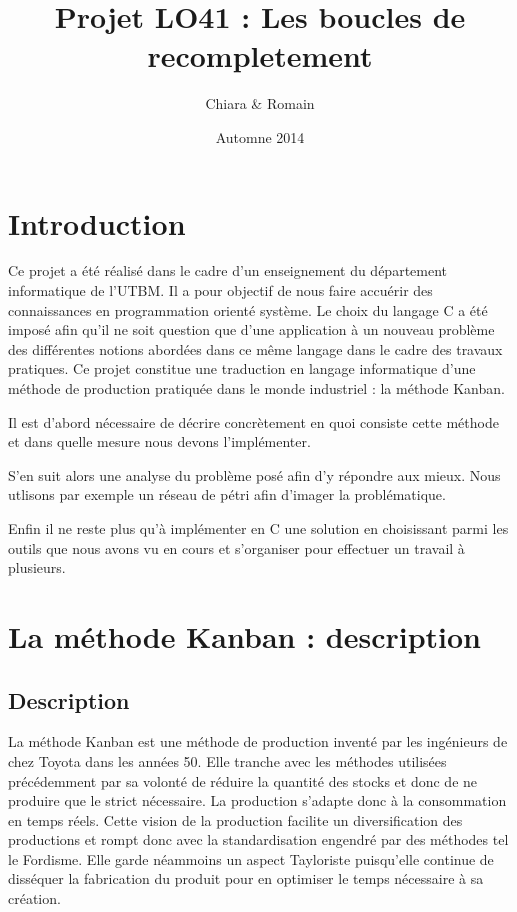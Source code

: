 \documentclass[11pt]{report}
\title{ Projet LO41 : Les boucles de recompletement}
\author{Chiara \bsc{Salvoni} \& Romain \bsc{Thibaud}}
\date{Automne 2014}
\begin{document}
\maketitle

\tableofcontents

\chapter{Introduction}

Ce projet a été réalisé dans le cadre d'un enseignement du département informatique de l'UTBM. Il a pour objectif de nous faire accuérir des connaissances en programmation orienté système. Le choix du langage C a été imposé afin qu'il ne soit question que d'une application à un nouveau problème des différentes notions abordées dans ce même langage dans le cadre des travaux pratiques. Ce projet constitue une traduction en langage informatique d'une méthode de production pratiquée dans le monde industriel : la méthode Kanban. 

Il est d'abord nécessaire de décrire concrètement en quoi consiste cette méthode et dans quelle mesure nous devons l'implémenter. 

S'en suit alors une analyse du problème posé afin d'y répondre aux mieux. Nous utlisons par exemple un réseau de pétri afin d'imager la problématique. 

Enfin il ne reste plus qu'à implémenter en C une solution en choisissant parmi les outils que nous avons vu en cours et s'organiser pour effectuer un travail à plusieurs.

\chapter{La méthode Kanban : description}

	\section{Description}
	
	La méthode Kanban est une méthode de production inventé par les ingénieurs de chez Toyota dans les années 50. Elle tranche avec les méthodes utilisées précédemment par sa volonté de réduire la quantité des stocks et donc de ne produire que le strict nécessaire. La production s'adapte donc à la consommation en temps réels. Cette vision de la production facilite un diversification des productions et rompt donc avec la standardisation engendré par des méthodes tel le Fordisme. Elle garde néammoins un aspect Tayloriste puisqu'elle continue de disséquer la fabrication du produit pour en optimiser le temps nécessaire à sa création.
	
\end{document}
